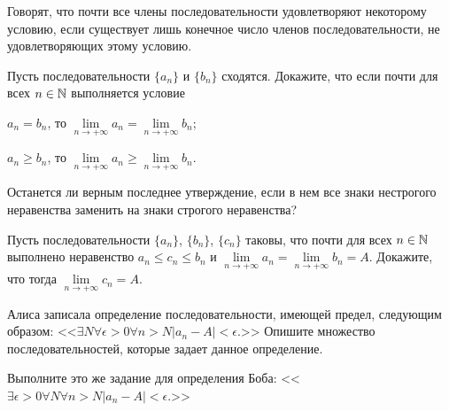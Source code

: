 \documentclass[a4paper, 12pt, num=30]{listok}
\begin{document}
\begin{definition}
    Говорят, что почти все члены последовательности удовлетворяют некоторому условию,
    если существует лишь конечное число членов последовательности, не удовлетворяющих этому условию.
\end{definition}
\begin{problem}
    Пусть последовательности $\{a_n\}$ и $\{b_n\}$ сходятся.
    Докажите, что если почти для всех $n \in \mathbb{N}$ выполняется условие
    \begin{probparts}
        \item $a_n = b_n$, то $\lim\limits_{n \to +\infty} a_n = \lim\limits_{n \to +\infty} b_n$;
        \item $a_n \ge b_n$, то $\lim\limits_{n \to +\infty} a_n \ge \lim\limits_{n \to +\infty} b_n$.
        \item Останется ли верным последнее утверждение, если в нем все знаки нестрогого неравенства заменить на знаки строгого неравенства?
    \end{probparts}
\end{problem}
\begin{problem}
    Пусть последовательности $\{a_n\}$, $\{b_n\}$, $\{c_n\}$ таковы, что почти для всех $n \in \mathbb{N}$ выполнено неравенство
    $a_n \le c_n \le b_n$ и $\lim\limits_{n\to+\infty} a_n = \lim\limits_{n\to+\infty} b_n = A$.
    Докажите, что тогда $\lim\limits_{n\to+\infty} c_n = A$.
\end{problem}
\begin{problem}
\begin{probparts}
    \item Алиса записала определение последовательности, имеющей предел, следующим образом:
        <<$
            \exists{N}\forall{\epsilon > 0}\forall{n > N} |a_n - A| < \epsilon.
        $>>
        Опишите множество последовательностей, которые задает данное определение.
    \item Выполните это же задание для определения Боба:
        <<$
            \exists{\epsilon > 0} \forall N \forall{n > N} |a_n - A| < \epsilon.
        $>>
\end{probparts}
\end{problem}
\end{document}
